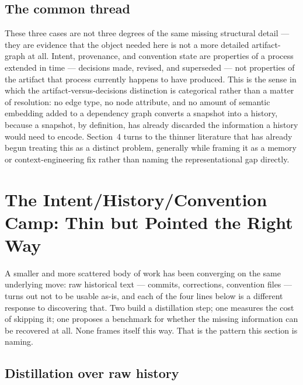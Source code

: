 \documentclass[11pt]{article}
\begin{document}
\subsection{The common thread}

These three cases are not three degrees of the same missing structural detail --- they are evidence that the object needed here is not a more detailed artifact-graph at all. Intent, provenance, and convention state are properties of a process extended in time --- decisions made, revised, and superseded --- not properties of the artifact that process currently happens to have produced. This is the sense in which the artifact-versus-decisions distinction is categorical rather than a matter of resolution: no edge type, no node attribute, and no amount of semantic embedding added to a dependency graph converts a snapshot into a history, because a snapshot, by definition, has already discarded the information a history would need to encode. Section~4 turns to the thinner literature that has already begun treating this as a distinct problem, generally while framing it as a memory or context-engineering fix rather than naming the representational gap directly.

\section{The Intent/History/Convention Camp: Thin but Pointed the Right Way}

A smaller and more scattered body of work has been converging on the same underlying move: raw historical text --- commits, corrections, convention files --- turns out not to be usable as-is, and each of the four lines below is a different response to discovering that. Two build a distillation step; one measures the cost of skipping it; one proposes a benchmark for whether the missing information can be recovered at all. None frames itself this way. That is the pattern this section is naming.

\subsection{Distillation over raw history}
\end{document}

